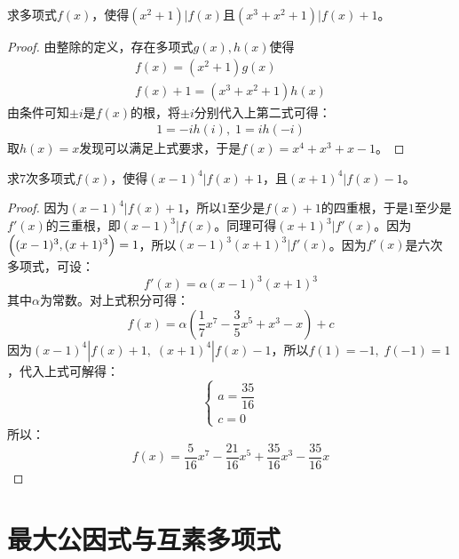 \begin{theorem}
	求多项式$f(x)$，使得$(x^2+1)|f(x)$且$(x^3+x^2+1)|f(x)+1$。
\end{theorem}
\begin{proof}
	由整除的定义，存在多项式$g(x),h(x)$使得
	\begin{gather*}
		f(x)=(x^2+1)g(x) \\
		f(x)+1=(x^3+x^2+1)h(x)
	\end{gather*}
	由条件可知$\pm i$是$f(x)$的根，将$\pm i$分别代入上第二式可得：
	\begin{gather*}
		1=-ih(i),\;1=ih(-i)
	\end{gather*}
	取$h(x)=x$发现可以满足上式要求，于是$f(x)=x^4+x^3+x-1$。
\end{proof}
\begin{theorem}
	求$7$次多项式$f(x)$，使得$(x-1)^4|f(x)+1$，且$(x+1)^4|f(x)-1$。
\end{theorem}
\begin{proof}
	因为$(x-1)^4|f(x)+1$，所以$1$至少是$f(x)+1$的四重根，于是$1$至少是$f'(x)$的三重根，即$(x-1)^3|f(x)$。同理可得$(x+1)^3|f'(x)$。因为$\Bigl((x-1)^3,(x+1)^3\Bigr)=1$，所以$(x-1)^3(x+1)^3|f'(x)$。因为$f'(x)$是六次多项式，可设：
	\begin{equation*}
		f'(x)=\alpha(x-1)^3(x+1)^3
	\end{equation*}
	其中$\alpha$为常数。对上式积分可得：
	\begin{equation*}
		f(x)=\alpha\left(\frac{1}{7}x^7-\frac{3}{5}x^5+x^3-x\right)+c
	\end{equation*}
	因为$(x-1)^4|f(x)+1,\;(x+1)^4|f(x)-1$，所以$f(1)=-1,\;f(-1)=1$，代入上式可解得：
	\begin{equation*}
		\begin{cases}
			a=\dfrac{35}{16} \\
			c=0
		\end{cases}
	\end{equation*}
	所以：
	\begin{equation*}
		f(x)=\frac{5}{16}x^7-\frac{21}{16}x^5+\frac{35}{16}x^3-\frac{35}{16}x
	\end{equation*}
\end{proof}

\section{最大公因式与互素多项式}
